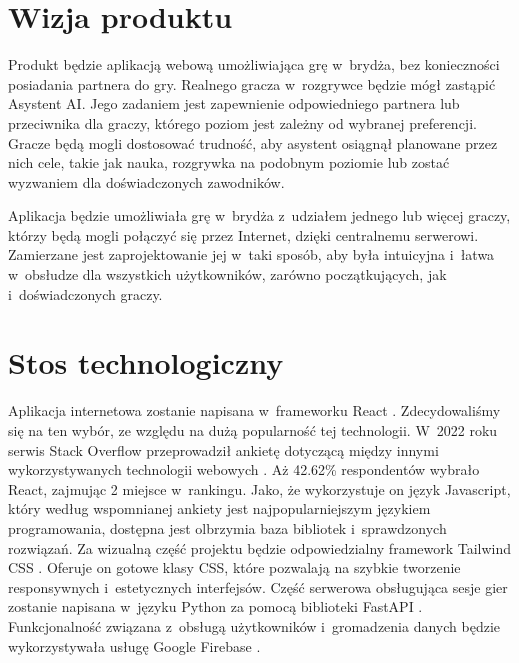 \section{Wizja produktu}

Produkt będzie aplikacją webową umożliwiająca grę w~brydża,
bez konieczności posiadania partnera do gry. Realnego gracza
w~rozgrywce
będzie mógł zastąpić Asystent AI.
Jego zadaniem jest zapewnienie odpowiedniego
partnera lub przeciwnika dla graczy, którego poziom jest zależny od wybranej
preferencji. Gracze będą mogli dostosować trudność, aby asystent osiągnął
planowane przez nich cele, takie jak nauka, rozgrywka na podobnym poziomie
lub zostać wyzwaniem dla doświadczonych zawodników.

Aplikacja będzie umożliwiała grę w~brydża z~udziałem jednego lub więcej graczy,
którzy będą mogli połączyć się przez Internet, dzięki centralnemu serwerowi.
Zamierzane jest zaprojektowanie jej w~taki sposób, aby była intuicyjna i~łatwa
w~obsłudze dla wszystkich użytkowników, zarówno początkujących, jak
i~doświadczonych graczy.


\section{Stos technologiczny}

Aplikacja internetowa zostanie napisana w~frameworku React \cite{React}.
Zdecydowaliśmy się na ten wybór, ze względu na dużą popularność tej
technologii. W~2022 roku serwis Stack Overflow \cite{StackOverflow} przeprowadził ankietę dotyczącą między innymi wykorzystywanych technologii
webowych \cite{React-stack}. Aż 42.62\% respondentów wybrało React,
zajmując 2 miejsce w~rankingu. Jako, że wykorzystuje on język Javascript,
który według wspomnianej ankiety jest najpopularniejszym językiem programowania,
dostępna jest olbrzymia baza bibliotek i~sprawdzonych rozwiązań. Za wizualną
część projektu będzie odpowiedzialny framework Tailwind CSS \cite{Tailwind}.
Oferuje on gotowe klasy CSS, które pozwalają na szybkie tworzenie responsywnych
i~estetycznych interfejsów. Część serwerowa obsługująca sesje gier zostanie
napisana w~języku Python \cite{Python} za pomocą biblioteki FastAPI
\cite{FastAPI}. Funkcjonalność związana z~obsługą użytkowników i~gromadzenia
danych będzie wykorzystywała usługę Google Firebase \cite{Firebase}.


